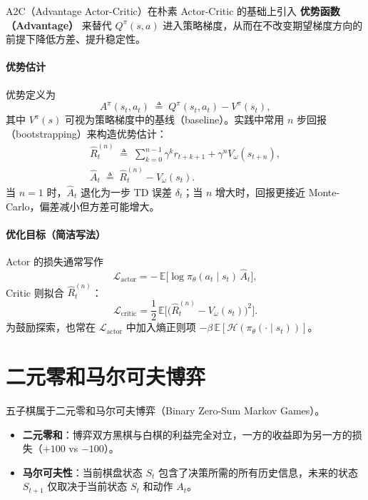 \documentclass[oneside]{ctexbook}
\begin{document}
A2C（Advantage Actor-Critic）在朴素 Actor-Critic 的基础上引入 \textbf{优势函数（Advantage）} 来替代 $Q^{\pi}(s,a)$ 进入策略梯度，从而在不改变期望梯度方向的前提下降低方差、提升稳定性。

\paragraph{优势估计}
优势定义为
\begin{equation}
A^{\pi}(s_t,a_t) \;\triangleq\; Q^{\pi}(s_t,a_t)-V^{\pi}(s_t),
\end{equation}
其中 $V^{\pi}(s)$ 可视为策略梯度中的基线（baseline）。实践中常用 $n$ 步回报（bootstrapping）来构造优势估计：
\begin{gather}
\hat R_t^{(n)} \;\triangleq\; \sum_{k=0}^{n-1}\gamma^k r_{t+k+1} + \gamma^n V_\omega(s_{t+n}),\\
\hat A_t \;\triangleq\; \hat R_t^{(n)} - V_\omega(s_t).
\end{gather}
当 $n=1$ 时，$\hat A_t$ 退化为一步 TD 误差 $\delta_t$；当 $n$ 增大时，回报更接近 Monte-Carlo，偏差减小但方差可能增大。

\paragraph{优化目标（简洁写法）}
Actor 的损失通常写作
\begin{equation}
\mathcal L_{\text{actor}} = -\,\mathbb E\bigl[\log\pi_\theta(a_t\mid s_t)\,\hat A_t\bigr],
\end{equation}
Critic 则拟合 $\hat R_t^{(n)}$：
\begin{equation}
\mathcal L_{\text{critic}} = \frac{1}{2}\,\mathbb E\bigl[\bigl(\hat R_t^{(n)}-V_\omega(s_t)\bigr)^2\bigr].
\end{equation}
为鼓励探索，也常在 $\mathcal L_{\text{actor}}$ 中加入熵正则项 $-\beta\,\mathbb E[\mathcal H(\pi_\theta(\cdot\mid s_t))]$。

\section{二元零和马尔可夫博弈} \label{sec:bzs_mg}
五子棋属于二元零和马尔可夫博弈（Binary Zero-Sum Markov Games）。
\begin{itemize}
    \item \textbf{二元零和}：博弈双方黑棋与白棋的利益完全对立，一方的收益即为另一方的损失（$+100$ vs $-100$）。
    \item \textbf{马尔可夫性}：当前棋盘状态 $S_t$ 包含了决策所需的所有历史信息，未来的状态 $S_{t+1}$ 仅取决于当前状态 $S_t$ 和动作 $A_t$。
\end{itemize}
\end{document}
